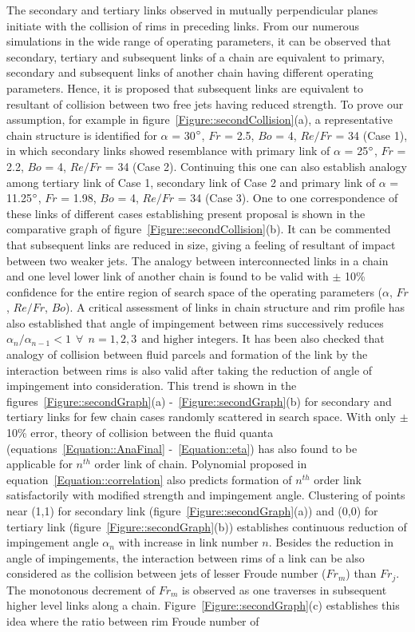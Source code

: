 \documentclass[%
 aip,
 sd,%
amsmath,amssymb,
preprint,%
author-year,%
]{revtex4-1}
\begin{document}
The secondary and tertiary links observed in mutually perpendicular planes initiate with the collision of rims in preceding links. From our numerous simulations in the wide range of operating parameters, it can be observed that secondary, tertiary and subsequent links of a chain are equivalent to primary, secondary and subsequent links of another chain having different operating parameters. Hence, it is proposed that subsequent links are equivalent to resultant of collision between two free jets having reduced strength. {\color{red}To prove our  assumption, for example} in figure~\ref{Figure::secondCollision}(a), a representative chain structure is identified for $\alpha$ = 30$\degree$, $Fr$ = 2.5, $Bo$ = 4, $Re/Fr$ = 34 (Case 1), in which secondary links showed resemblance with primary link of $\alpha$ = 25$\degree$, $Fr$ = 2.2, $Bo$ = 4, $Re/Fr$ = 34 (Case 2). Continuing this one can also establish analogy among tertiary link of Case 1, secondary link of Case 2 and primary link of $\alpha$ = 11.25$\degree$, $Fr$ = 1.98, $Bo$ = 4, $Re/Fr$ = 34 (Case 3). One to one correspondence of these links of different cases establishing present proposal is shown in the comparative graph of figure~\ref{Figure::secondCollision}(b). It can be commented that subsequent links are reduced in size, giving a feeling of resultant of impact between two {\color{red}weaker} jets. {\color{red}The analogy between interconnected links in a chain and one level lower link of another chain} is found to be valid with $\pm$ 10\% confidence for the entire region of search space of the operating parameters ($\alpha$, $Fr$, $Re/Fr$, $Bo$). A critical assessment of links in chain structure and rim profile {\color{red}has} also established that angle of impingement between rims successively reduces $\alpha_{n}/\alpha_{n-1} < 1 \:\:\forall\:\: n = 1, 2, 3 \:\:\text{and higher integers}$. It has been also checked that analogy of collision between fluid parcels and formation of the link by the interaction between rims is also valid after taking the reduction of angle of impingement into consideration. {\color{red}This trend is shown in the figures}~\ref{Figure::secondGraph}(a) -~\ref{Figure::secondGraph}(b) for secondary and tertiary links for few chain cases randomly scattered in search space. With only $\pm$ 10\% error, theory of collision between the fluid quanta (equations~\ref{Equation::AnaFinal} -~\ref{Equation::eta}) has also found to be applicable for $n^{th}$ order link of chain. Polynomial proposed in equation~\ref{Equation::correlation} also predicts {\color{red}formation} of $n^{th}$ order link satisfactorily with modified strength and impingement angle. Clustering of points near (1,1) for secondary link (figure~\ref{Figure::secondGraph}(a)) and (0,0) for tertiary link (figure~\ref{Figure::secondGraph}(b)) establishes continuous reduction of impingement angle $\alpha_{n}$ with increase in link number $n$. Besides the reduction in angle of impingements, the interaction between rims of a link can be also considered as the collision between jets of lesser Froude number ($Fr_m$) than $Fr_j$. The monotonous decrement of $Fr_m$ is observed as one traverses in subsequent higher level links along a chain. Figure~\ref{Figure::secondGraph}(c) establishes this idea where the ratio between rim Froude number of 
\end{document}

